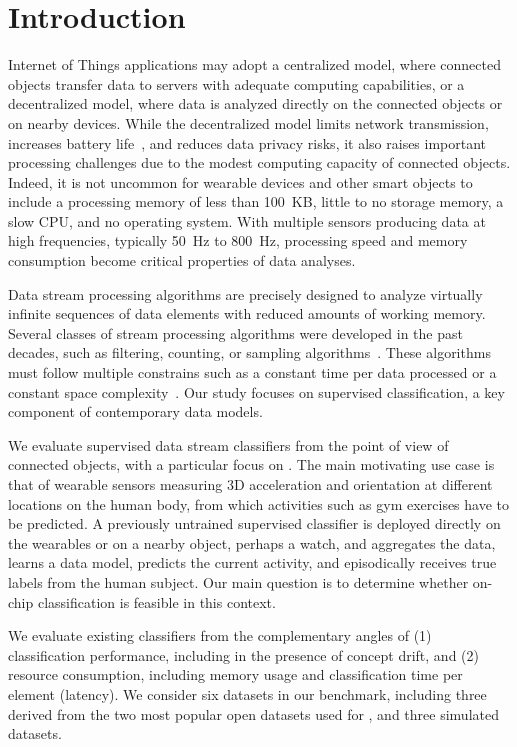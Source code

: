 \section{Introduction}
\label{sec:introduction}

Internet of Things applications may adopt a centralized model, where connected
objects transfer data to servers with adequate computing capabilities, or a
decentralized model, where data is analyzed directly on the connected objects or
on nearby devices. While the decentralized model limits network transmission,
increases battery life~\cite{sensor-network-survey, sensor-energy-model}, and
reduces data privacy risks, it also raises important processing challenges due
to the modest computing capacity of connected objects. Indeed, it is not
uncommon for wearable devices and other smart objects to include a processing
memory of less than 100~KB, little to no storage memory, a slow CPU, and no
operating system. With multiple sensors producing data at high frequencies,
typically 50~Hz to 800~Hz, processing speed and memory consumption become
critical properties of data analyses. 

Data stream processing algorithms are precisely designed to analyze virtually
infinite sequences of data elements with reduced amounts of working memory.
Several classes of stream processing algorithms were developed in the past
decades, such as filtering, counting, or sampling
algorithms~\cite{kejariwal2015}.  These algorithms must follow multiple
constrains such as a constant time per data processed or a constant space
complexity~\cite{issues_learning_from_stream}.  Our study focuses on supervised
classification, a key component of contemporary data models.

We evaluate supervised data stream classifiers from the point of view of
connected objects, with a particular focus on \har. The main motivating use case
is that of wearable sensors measuring 3D acceleration and orientation at
different locations on the human body, from which activities such as gym
exercises have to be predicted. A previously untrained supervised classifier is
deployed directly on the wearables or on a nearby object, perhaps a watch, and
aggregates the data, learns a data model, predicts the current activity, and
episodically receives true labels from the human subject. Our main question is
to determine whether on-chip classification is feasible in this context. 

We evaluate existing classifiers from the complementary angles of (1)
classification performance, including in the presence of concept drift, and
(2) resource consumption, including memory usage and classification time
per element (latency). We consider six datasets in our benchmark, including
three derived from the two most popular open datasets used for \har, and
three simulated datasets.

